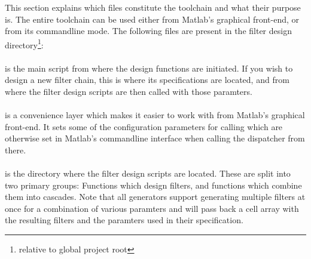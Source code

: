 This  section explains  which files  constitute the  toolchain and  what their
purpose is. The  entire toolchain can  be used either from  Matlab's graphical
front-end, or  from its commandline  mode. The following files are  present in
the filter design directory\footnote{%
    relative to global project root%
}:
\vspace{2ex}
\noindent{}

\paragraph{} is  the main  script from where  the design
functions are initiated.   If you wish to  design a new filter  chain, this is
where its specifications are located, and from where the filter design scripts
are then called with those paramters.

\paragraph{} is  a convenience layer which  makes it easier
to work with  from Matlab's graphical front-end. It sets
some  of  the  configuration  parameters  for  calling  
which are  otherwise set  in Matlab's commandline  interface when  calling the
dispatcher from there.

\paragraph{}  is  the  directory  where  the  filter  design
scripts are located. These are split  into two primary groups: Functions which
design filters, and functions which  combine them into cascades. Note that all
generators support  generating multiple filters  at once for a  combination of
various paramters and  will pass back a cell array  with the resulting filters
and the paramters used in their specification.

